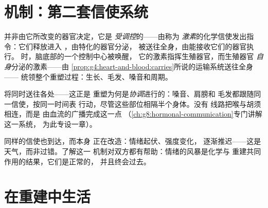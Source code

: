 \section{机制：第二套信使系统}

\begin{definition}[激素初识]\label{def:g8:puberty:hormones}
并非由它所改变的器官决定，它是
\emph{受调控}的——由称为
\emph{激素}的化学信使发出指令：它们释放进入
\emph{}，由特化的器官分泌，
被送往全身，由能接收它们的器官执行。
时，脑底部的一个控制中心被唤醒，
它的激素指挥生殖器官，而生殖器官
\emph{自身}分泌的激素——由
\cref{prop:g4:heart-and-blood:carries}所说的运输系统送往全身——
统领整个重塑过程：生长、毛发、嗓音和周期。
\end{definition}

\begin{example}\label{ex:g8:puberty:sites}
将同时送往各处——这正是
重塑为何是\emph{协调}进行的：嗓音、肩膀和
毛发都跟随同一信使，按同一时间表
行动，尽管这些部位相隔半个身体。没有
线路把喉与胡须相连，而是
由血流的广播完成这一点
（\cref{ch:g8:hormonal-communication}专门讲解这一系统，
为此专设一章）。
\end{example}

\begin{remark}[为何会有情绪的“天气”？]\label{rem:g8:puberty:moods}
同样的信使也到达，而本身
正在改造：情绪起伏、强度变化，
逐渐推迟——这是天气，而非过错。了解这一
机制对双方都有帮助：情绪的风暴是化学与
重建共同作用的结果，它们是正常的，
并且终会过去。
\end{remark}

\section{在重建中生活}

